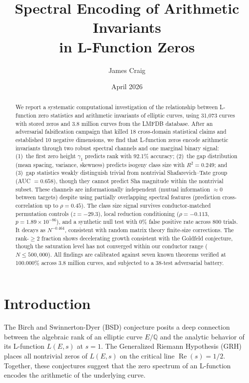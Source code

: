 \documentclass[11pt,a4paper]{article}
\title{Spectral Encoding of Arithmetic Invariants\\
  in L-Function Zeros}
\author[1]{James Craig}
\affil[1]{JFI Research}
\date{April 2026}
\begin{document}
\maketitle

\begin{abstract}
We report a systematic computational investigation of the relationship between L-function zero statistics and arithmetic invariants of elliptic curves, using 31,073 curves with stored zeros and 3.8 million curves from the LMFDB database. After an adversarial falsification campaign that killed 18 cross-domain statistical claims and established 10 negative dimensions, we find that L-function zeros encode arithmetic invariants through two robust spectral channels and one marginal binary signal: (1)~the first zero height $\gamma_1$ predicts rank with 92.1\% accuracy; (2)~the gap distribution (mean spacing, variance, skewness) predicts isogeny class size with $R^2 = 0.249$; and (3)~gap statistics weakly distinguish trivial from nontrivial Shafarevich--Tate group (AUC $= 0.658$), though they cannot predict Sha magnitude within the nontrivial subset. These channels are informationally independent (mutual information $\approx 0$ between targets) despite using partially overlapping spectral features (prediction cross-correlation up to $\rho = 0.45$). The class size signal survives conductor-matched permutation controls ($z = -29.3$), local reduction conditioning ($\rho = -0.113$, $p = 1.89 \times 10^{-86}$), and a synthetic null test with 0\% false positive rate across 800 trials. It decays as $N^{-0.464}$, consistent with random matrix theory finite-size corrections. The rank-${\geq}2$ fraction shows decelerating growth consistent with the Goldfeld conjecture, though the saturation level has not converged within our conductor range ($N \leq 500{,}000$). All findings are calibrated against seven known theorems verified at 100.000\% across 3.8 million curves, and subjected to a 38-test adversarial battery.
\end{abstract}

\section{Introduction}

The Birch and Swinnerton-Dyer (BSD) conjecture posits a deep connection between the algebraic rank of an elliptic curve $E/\mathbb{Q}$ and the analytic behavior of its L-function $L(E,s)$ at $s = 1$. The Generalized Riemann Hypothesis (GRH) places all nontrivial zeros of $L(E,s)$ on the critical line $\operatorname{Re}(s) = 1/2$. Together, these conjectures suggest that the zero spectrum of an L-function encodes the arithmetic of the underlying curve.
\end{document}
